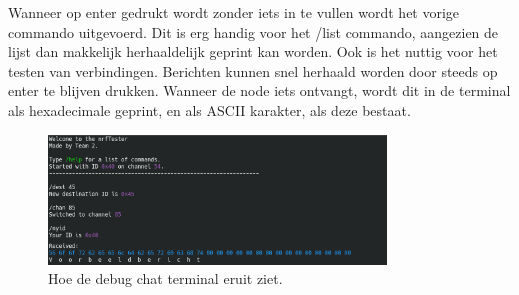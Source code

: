 Wanneer op enter gedrukt wordt zonder iets in te vullen wordt het vorige commando uitgevoerd. Dit is erg handig voor het /list commando, aangezien de lijst dan makkelijk herhaaldelijk geprint kan worden. Ook is het nuttig voor het testen van verbindingen. Berichten kunnen snel herhaald worden door steeds op enter te blijven drukken. Wanneer de node iets ontvangt, wordt dit in de terminal als hexadecimale geprint, en als ASCII karakter, als deze bestaat. 

\begin{figure}[ht]
    \centering
    \includegraphics[width=0.8\textwidth]{img/nrfchat.png}
    \caption{Hoe de debug chat terminal eruit ziet.}
    \label{fig:debugTerminal}
\end{figure}





